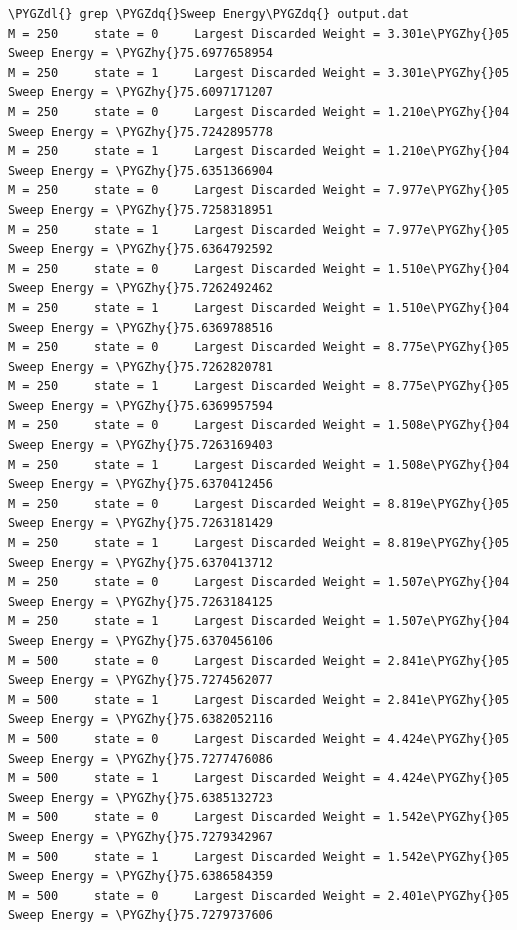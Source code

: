 \documentclass[letterpaper,10pt,english]{sphinxmanual}
\def\PYGZdl{\char`\$}
\def\PYGZhy{\char`\-}
\def\PYGZdq{\char`\"}
\begin{document}
\begin{Verbatim}[commandchars=\\\{\}]
\PYGZdl{} grep \PYGZdq{}Sweep Energy\PYGZdq{} output.dat
M = 250     state = 0     Largest Discarded Weight = 3.301e\PYGZhy{}05  Sweep Energy = \PYGZhy{}75.6977658954
M = 250     state = 1     Largest Discarded Weight = 3.301e\PYGZhy{}05  Sweep Energy = \PYGZhy{}75.6097171207
M = 250     state = 0     Largest Discarded Weight = 1.210e\PYGZhy{}04  Sweep Energy = \PYGZhy{}75.7242895778
M = 250     state = 1     Largest Discarded Weight = 1.210e\PYGZhy{}04  Sweep Energy = \PYGZhy{}75.6351366904
M = 250     state = 0     Largest Discarded Weight = 7.977e\PYGZhy{}05  Sweep Energy = \PYGZhy{}75.7258318951
M = 250     state = 1     Largest Discarded Weight = 7.977e\PYGZhy{}05  Sweep Energy = \PYGZhy{}75.6364792592
M = 250     state = 0     Largest Discarded Weight = 1.510e\PYGZhy{}04  Sweep Energy = \PYGZhy{}75.7262492462
M = 250     state = 1     Largest Discarded Weight = 1.510e\PYGZhy{}04  Sweep Energy = \PYGZhy{}75.6369788516
M = 250     state = 0     Largest Discarded Weight = 8.775e\PYGZhy{}05  Sweep Energy = \PYGZhy{}75.7262820781
M = 250     state = 1     Largest Discarded Weight = 8.775e\PYGZhy{}05  Sweep Energy = \PYGZhy{}75.6369957594
M = 250     state = 0     Largest Discarded Weight = 1.508e\PYGZhy{}04  Sweep Energy = \PYGZhy{}75.7263169403
M = 250     state = 1     Largest Discarded Weight = 1.508e\PYGZhy{}04  Sweep Energy = \PYGZhy{}75.6370412456
M = 250     state = 0     Largest Discarded Weight = 8.819e\PYGZhy{}05  Sweep Energy = \PYGZhy{}75.7263181429
M = 250     state = 1     Largest Discarded Weight = 8.819e\PYGZhy{}05  Sweep Energy = \PYGZhy{}75.6370413712
M = 250     state = 0     Largest Discarded Weight = 1.507e\PYGZhy{}04  Sweep Energy = \PYGZhy{}75.7263184125
M = 250     state = 1     Largest Discarded Weight = 1.507e\PYGZhy{}04  Sweep Energy = \PYGZhy{}75.6370456106
M = 500     state = 0     Largest Discarded Weight = 2.841e\PYGZhy{}05  Sweep Energy = \PYGZhy{}75.7274562077
M = 500     state = 1     Largest Discarded Weight = 2.841e\PYGZhy{}05  Sweep Energy = \PYGZhy{}75.6382052116
M = 500     state = 0     Largest Discarded Weight = 4.424e\PYGZhy{}05  Sweep Energy = \PYGZhy{}75.7277476086
M = 500     state = 1     Largest Discarded Weight = 4.424e\PYGZhy{}05  Sweep Energy = \PYGZhy{}75.6385132723
M = 500     state = 0     Largest Discarded Weight = 1.542e\PYGZhy{}05  Sweep Energy = \PYGZhy{}75.7279342967
M = 500     state = 1     Largest Discarded Weight = 1.542e\PYGZhy{}05  Sweep Energy = \PYGZhy{}75.6386584359
M = 500     state = 0     Largest Discarded Weight = 2.401e\PYGZhy{}05  Sweep Energy = \PYGZhy{}75.7279737606

\end{Verbatim}
\end{document}
